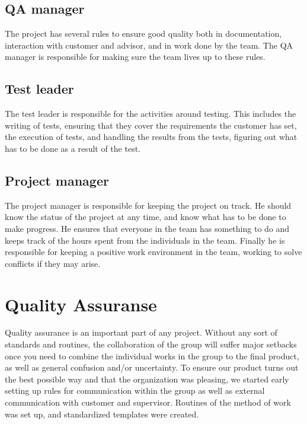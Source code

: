 \documentclass[11pt]{book}
\begin{document}
\subsection{QA manager}
The project has several rules to ensure good quality both in documentation, interaction with customer and advisor, and in work done by the team. The QA manager is responsible for making sure the team lives up to these rules.

\subsection{Test leader}
The test leader is responsible for the activities around testing. This includes the writing of tests, ensuring that they cover the requirements the customer has set, the execution of tests, and handling the results from the tests, figuring out what has to be done as a result of the test.

\subsection{Project manager}
The project manager is responsible for keeping the project on track. He should know the status of the project at any time, and know what has to be done to make progress. He ensures that everyone in the team has something to do and keeps track of the hours spent from the individuals in the team. Finally he is responsible for keeping a positive work environment in the team, working to solve conflicts if they may arise.

\section{Quality Assuranse}
Quality assurance is an important part of any project. Without any sort of standards and routines, the collaboration of the group will suffer major setbacks once you need to combine the individual works in the group to the final product, as well as general confusion and/or uncertainty. To ensure our product turns out the best possible way and that the organization was pleasing, we started early setting up rules for communication within the group as well as external communication with customer and supervisor. Routines of the method of work was set up, and standardized templates were created.
\end{document}

